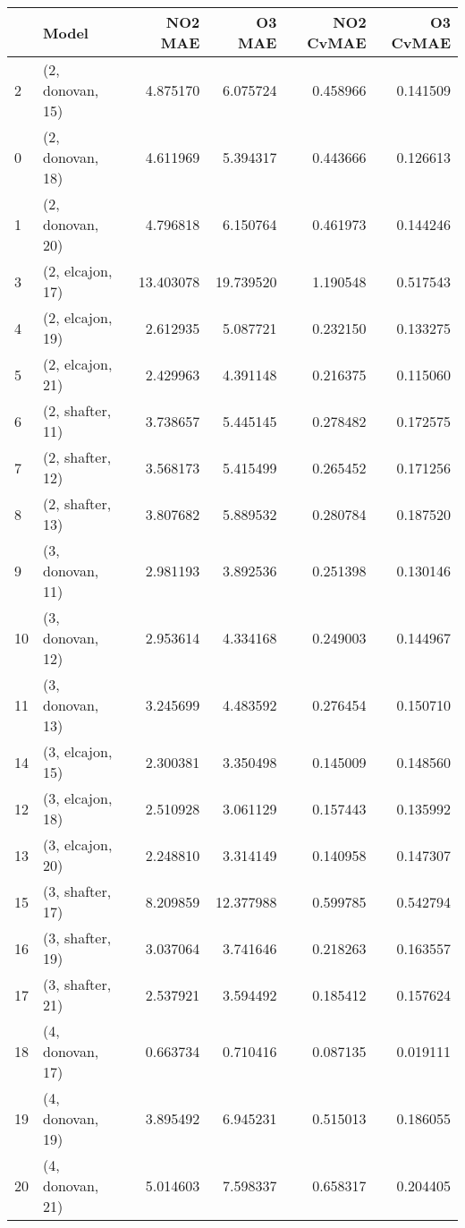 \begin{tabular}{llrrrr}
\toprule
{} &             Model &    NO2 MAE &     O3 MAE &  NO2 CvMAE &  O3 CvMAE \\
\midrule
2  &  (2, donovan, 15) &   4.875170 &   6.075724 &   0.458966 &  0.141509 \\
0  &  (2, donovan, 18) &   4.611969 &   5.394317 &   0.443666 &  0.126613 \\
1  &  (2, donovan, 20) &   4.796818 &   6.150764 &   0.461973 &  0.144246 \\
3  &  (2, elcajon, 17) &  13.403078 &  19.739520 &   1.190548 &  0.517543 \\
4  &  (2, elcajon, 19) &   2.612935 &   5.087721 &   0.232150 &  0.133275 \\
5  &  (2, elcajon, 21) &   2.429963 &   4.391148 &   0.216375 &  0.115060 \\
6  &  (2, shafter, 11) &   3.738657 &   5.445145 &   0.278482 &  0.172575 \\
7  &  (2, shafter, 12) &   3.568173 &   5.415499 &   0.265452 &  0.171256 \\
8  &  (2, shafter, 13) &   3.807682 &   5.889532 &   0.280784 &  0.187520 \\
9  &  (3, donovan, 11) &   2.981193 &   3.892536 &   0.251398 &  0.130146 \\
10 &  (3, donovan, 12) &   2.953614 &   4.334168 &   0.249003 &  0.144967 \\
11 &  (3, donovan, 13) &   3.245699 &   4.483592 &   0.276454 &  0.150710 \\
14 &  (3, elcajon, 15) &   2.300381 &   3.350498 &   0.145009 &  0.148560 \\
12 &  (3, elcajon, 18) &   2.510928 &   3.061129 &   0.157443 &  0.135992 \\
13 &  (3, elcajon, 20) &   2.248810 &   3.314149 &   0.140958 &  0.147307 \\
15 &  (3, shafter, 17) &   8.209859 &  12.377988 &   0.599785 &  0.542794 \\
16 &  (3, shafter, 19) &   3.037064 &   3.741646 &   0.218263 &  0.163557 \\
17 &  (3, shafter, 21) &   2.537921 &   3.594492 &   0.185412 &  0.157624 \\
18 &  (4, donovan, 17) &   0.663734 &   0.710416 &   0.087135 &  0.019111 \\
19 &  (4, donovan, 19) &   3.895492 &   6.945231 &   0.515013 &  0.186055 \\
20 &  (4, donovan, 21) &   5.014603 &   7.598337 &   0.658317 &  0.204405 \\

\end{tabular}
